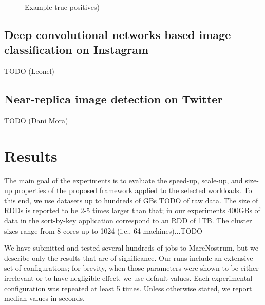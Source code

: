 \documentclass[smallextended]{svjour3}       %
\begin{document}
\begin{figure}
\caption{Example true positives)}
\label{fig:spamexamples}
\end{figure}

\subsection{Deep convolutional networks based image classification on Instagram}

TODO (Leonel)

\subsection{Near-replica image detection on Twitter}

TODO (Dani Mora)

%
\section{Results}
%
The main goal of the experiments is to evaluate the speed-up, scale-up, and size-up properties of the proposed framework applied to the selected workloads. To this end, we use datasets up to hundreds of GBs TODO of raw data. The size of RDDs is reported to be 2-5 times larger than that; in our experiments 400GBs of data in the sort-by-key application correspond to an RDD of 1TB.
 The cluster sizes range from 8 cores up to 1024 (i.e., 64 machines)...TODO

We have submitted and tested several hundreds of jobs to MareNostrum, but we describe only the results that are of significance. Our runs include an extensive  set of configurations; for brevity, when those parameters were shown to be either irrelevant or to have negligible effect, we use default values. Each experimental configuration was repeated at least 5 times. Unless otherwise stated, we report median values in seconds. 
\end{document}
